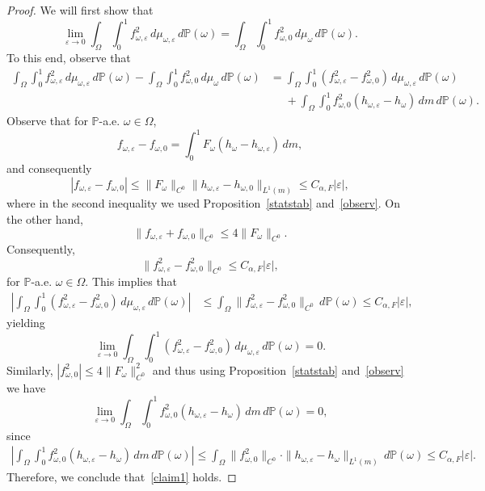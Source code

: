 \documentclass[12pt,reqno,a4paper]{article}
\begin{document}
	\begin{proof}
		We will first show that
		\begin{equation}\label{claim1}
			\lim_{\varepsilon \to 0}\int_\Omega\int_0^1 f_{\omega, \varepsilon}^2\, d \mu_{\omega,  \varepsilon}\, d\mathbb P(\omega)=\int_\Omega\int_0^1 f_{\omega, 0}^2\, d\mu_\omega\, d\mathbb P(\omega).
		\end{equation}
		To this end, observe that 
		\[
		\begin{split}
			\int_\Omega\int_0^1 f_{\omega, \varepsilon}^2\, d\mu_{\omega,  \varepsilon}\, d\mathbb P(\omega)-\int_\Omega\int_0^1 f_{\omega, 0}^2\, d\mu_\omega\, d\mathbb P(\omega) &=\int_\Omega \int_0^1 (f_{\omega, \varepsilon}^2-f_{\omega, 0}^2)\, d\mu_{\omega, \varepsilon}\, d\mathbb P(\omega)\\
			&\phantom{=}+\int_\Omega \int_0^1 f_{\omega, 0}^2(h_{\omega, \varepsilon}-h_{\omega})\,dm\, d\mathbb P(\omega).
		\end{split}
		\]
		Observe that for $\mathbb P$-a.e. $\omega \in \Omega$,
		\begin{equation}\label{difference1}
			f_{\omega, \varepsilon}-f_{\omega, 0}=\int_0^1F_\omega (h_\omega-h_{\omega, \varepsilon})\, dm,
		\end{equation}
		and consequently
		\[
		|f_{\omega, \varepsilon}-f_{\omega, 0}|\le \|F_\omega\|_{C^0}\|h_{\omega, \varepsilon}-h_{\omega, 0}\|_{L^1(m)} \le C_{\alpha, F} |\varepsilon|,
		\]
		where in the second inequality we used Proposition~\ref{statstab} and~\eqref{observ}. On the other hand,
		\[
		\|f_{\omega, \varepsilon}+f_{\omega, 0}\|_{C^0}\le 4\|F_\omega \|_{C^0}.
		\]
		Consequently,
		\[
		\|f_{\omega, \varepsilon}^2-f_{\omega, 0}^2\|_{C^0}\le C_{\alpha, F}|\varepsilon|,
		\]
		for $\mathbb P$-a.e. $\omega \in \Omega$. This implies that 
		\[
		\begin{split}
			\left |\int_\Omega \int_0^1 (f_{\omega, \varepsilon}^2-f_{\omega, 0}^2)\, d\mu_{\omega, \varepsilon}\, d\mathbb P(\omega)\right | &\le \int_\Omega \|f_{\omega, \varepsilon}^2-f_{\omega, 0}^2\|_{C^0}\, d\mathbb P(\omega) \le C_{\alpha, F}|\varepsilon|, 
		\end{split}
		\]
		yielding 
		\[
		\lim_{\varepsilon \to 0}\int_\Omega \int_0^1 (f_{\omega, \varepsilon}^2-f_{\omega, 0}^2)\, d\mu_{\omega, \varepsilon}\, d\mathbb P(\omega)=0.
		\]
		Similarly, $|f_{\omega, 0}^2|\le 4\|F_\omega \|_{C^0}^2$ and thus using Proposition~\ref{statstab} and~\eqref{observ} we have
		\[
		\lim_{\varepsilon \to 0}\int_\Omega \int_0^1 f_{\omega, 0}^2(h_{\omega, \varepsilon}-h_{\omega})\,dm\, d\mathbb P(\omega)=0,
		\]
		since 
		\[
		\begin{split}
			\left |\int_\Omega \int_0^1 f_{\omega, 0}^2(h_{\omega, \varepsilon}-h_{\omega})\,dm\, d\mathbb P(\omega)\right | \le \int_\Omega \|f_{\omega, 0}^2\|_{C^0}\cdot \|h_{\omega, \varepsilon}-h_\omega \|_{L^1(m)}\, d\mathbb P(\omega)\le C_{\alpha, F} |\varepsilon|.
		\end{split}
		\]
		Therefore, we conclude that~\eqref{claim1} holds.
		

\end{proof}
\end{document}
